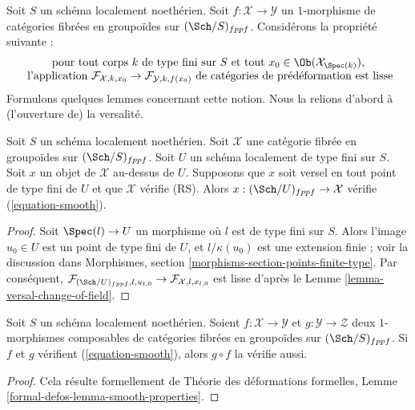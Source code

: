 \noindent
Soit $S$ un schéma localement noethérien.
Soit $f : \mathcal{X} \to \mathcal{Y}$ un $1$-morphisme de catégories
fibrées en groupoïdes sur $(\Sch/S)_{fppf}$. Considérons la propriété suivante :
\begin{equation}
\label{equation-smooth}
\begin{matrix}
\text{pour tout corps }k\text{ de type fini sur }S
\text{ et tout }x_0 \in \Ob(\mathcal{X}_{\Spec(k)})\text{,}\\
\text{ l'application }
\mathcal{F}_{\mathcal{X}, k, x_0} \to \mathcal{F}_{\mathcal{Y}, k, f(x_0)}
\text{ de catégories de prédéformation est lisse}
\end{matrix}
\end{equation}
Formulons quelques lemmes concernant cette notion. Nous la relions d'abord à
(l'ouverture de) la versalité.

\begin{lemma}
\label{lemma-versal-smooth}
Soit $S$ un schéma localement noethérien. Soit $\mathcal{X}$ une catégorie
fibrée en groupoïdes sur $(\Sch/S)_{fppf}$. Soit $U$ un schéma localement
de type fini sur $S$. Soit $x$ un objet de $\mathcal{X}$ au-dessus de $U$.
Supposons que $x$ soit versel en tout point de type fini de $U$ et que
$\mathcal{X}$ vérifie (RS). Alors $x : (\Sch/U)_{fppf} \to \mathcal{X}$
vérifie (\ref{equation-smooth}).
\end{lemma}

\begin{proof}
Soit $\Spec(l) \to U$ un morphisme où $l$ est de type fini sur $S$.
Alors l'image $u_0 \in U$ est un point de type fini de $U$, et
$l/\kappa(u_0)$ est une extension finie ; voir la discussion dans
Morphismes, section \ref{morphisms-section-points-finite-type}.
Par conséquent,
$\mathcal{F}_{(\Sch/U)_{fppf}, l, u_{l, 0}} \to
\mathcal{F}_{\mathcal{X}, l, x_{l, 0}}$
est lisse d'après le Lemme \ref{lemma-versal-change-of-field}.
\end{proof}

\begin{lemma}
\label{lemma-composition-smooth}
Soit $S$ un schéma localement noethérien. Soient $f : \mathcal{X} \to \mathcal{Y}$
et $g : \mathcal{Y} \to \mathcal{Z}$ deux $1$-morphismes composables de
catégories fibrées en groupoïdes sur $(\Sch/S)_{fppf}$. Si $f$ et $g$
vérifient (\ref{equation-smooth}), alors $g \circ f$ la vérifie aussi.
\end{lemma}

\begin{proof}
Cela résulte formellement de Théorie des déformations formelles, Lemme
\ref{formal-defos-lemma-smooth-properties}.
\end{proof}

